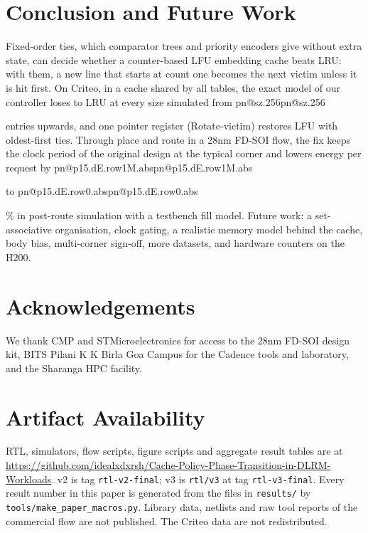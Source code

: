 \documentclass[conference,10pt]{IEEEtran}
\makeatletter
\newcommand{\R}[1]{\ifcsname pn@#1\endcsname\csname pn@#1\endcsname\else
  \PackageError{paper}{number key '#1' is not defined in macros.tex}{Run tools/make_paper_macros.py}\fi}
\makeatother
\begin{document}
\section{Conclusion and Future Work}
Fixed-order ties, which comparator trees and priority encoders give without extra state, can decide whether a
counter-based LFU embedding cache beats LRU: with them, a new line that starts at count one becomes the next victim
unless it is hit first. On Criteo, in a cache shared by all tables, the exact model of our controller loses to LRU at
every size simulated from \R{sz.256} entries upwards, and one pointer register (Rotate-victim) restores LFU with
oldest-first ties. Through place and route in a 28nm FD-SOI flow, the fix keeps the clock period of the original
design at the typical corner and lowers energy per request by \R{p15.dE.row1M.abs} to \R{p15.dE.row0.abs}\% in
post-route simulation with a testbench fill model. Future work: a
set-associative organisation, clock gating, a realistic memory model behind the cache, body bias, multi-corner
sign-off, more datasets, and hardware counters on the H200.

\section*{Acknowledgements}
We thank CMP and STMicroelectronics for access to the 28nm FD-SOI design kit, BITS Pilani K K Birla Goa Campus for
the Cadence tools and laboratory, and the Sharanga HPC facility.

\section*{Artifact Availability}
{\raggedright RTL, simulators, flow scripts, figure scripts and aggregate result tables are at
\url{https://github.com/idealxdxrsh/Cache-Policy-Phase-Transition-in-DLRM-Workloads}. v2 is tag
\texttt{rtl-v2-final}; v3 is \texttt{rtl/v3} at tag \texttt{rtl-v3-final}. Every result number in this paper is
generated from the files in \texttt{results/} by \texttt{tools/make\_paper\_macros.py}. Library data, netlists and
raw tool reports of the commercial flow are not published. The Criteo data are not redistributed.\par}



\end{document}
